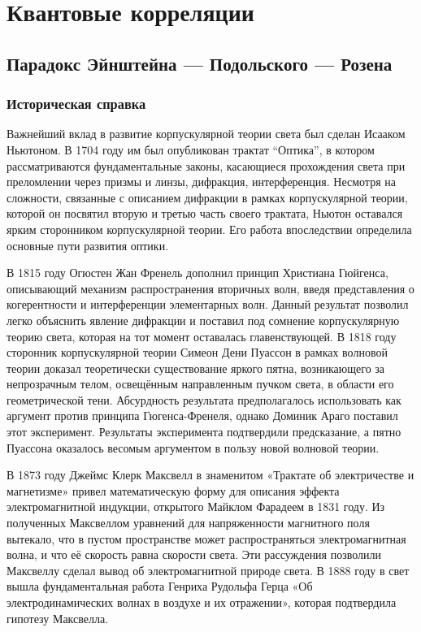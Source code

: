 \section{Квантовые корреляции}

\subsection{Парадокс Эйнштейна — Подольского — Розена}

\subsubsection{Историческая справка}

Важнейший вклад в развитие корпускулярной теории света был сделан Исааком Ньютоном.
В 1704 году им был опубликован трактат ``Оптика'',
в котором рассматриваются фундаментальные законы,
касающиеся прохождения света при преломлении через призмы и линзы, дифракция, интерференция.
Несмотря на сложности, связанные с описанием дифракции в рамках корпускулярной теории, которой он посвятил вторую и третью часть своего трактата,
Ньютон оставался ярким сторонником корпускулярной теории.
Его работа впоследствии определила основные пути развития оптики.

В 1815 году Огюстен Жан Френель дополнил принцип Христиана Гюйгенса,
описывающий механизм распространения вторичных волн,
введя представления о когерентности и интерференции элементарных волн.
Данный результат позволил легко объяснить явление дифракции
и поставил под сомнение корпускулярную теорию света,
которая на тот момент оставалась главенствующей.
В 1818 году сторонник корпускулярной теории Симеон Дени Пуассон
в рамках волновой теории доказал теоретически существование яркого пятна,
возникающего за непрозрачным телом,
освещённым направленным пучком света,
в области его геометрической тени.
Абсурдность результата предполагалось использовать как аргумент против принципа Гюгенса-Френеля,
однако Доминик Араго поставил этот эксперимент.
Результаты эксперимента подтвердили предсказание,
а пятно Пуассона оказалось весомым аргументом в пользу новой волновой теории.

В 1873 году Джеймс Клерк Максвелл в знаменитом «Трактате об электричестве и магнетизме»
привел математическую форму для описания эффекта электромагнитной индукции,
открытого Майклом Фарадеем в 1831 году.
Из полученных Максвеллом уравнений для напряженности магнитного поля вытекало, что в пустом пространстве может распространяться электромагнитная волна, и что её скорость равна скорости света.
Эти рассуждения позволили Максвеллу сделал вывод об электромагнитной природе света.
В 1888 году в свет вышла фундаментальная работа Генриха Рудольфа Герца «Об электродинамических волнах в воздухе и их отражении»,
которая подтвердила гипотезу Максвелла.

